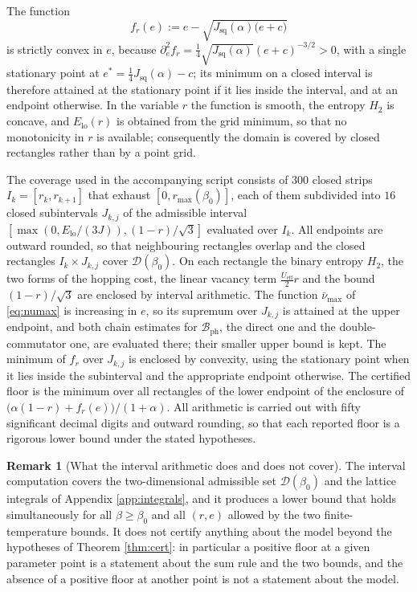 \documentclass[11pt]{article}
\numberwithin{equation}{section}
\newcommand{\ph}{\mathrm{ph}}
\newcommand{\eff}{\mathrm{eff}}
\theoremstyle{definition}
\newtheorem{remark}[theorem]{Remark}
\begin{document}
The function
\begin{equation}
f_{r}(e):=e-\sqrt{J_{\mathrm{sq}}(\alpha)\big(e+c\big)}
\label{eq:fr}
\end{equation}
is strictly convex in $e$, because $\partial_{e}^{2}f_{r}=\frac14\sqrt{J_{\mathrm{sq}}(\alpha)}(e+c)^{-3/2}>0$,
with a single stationary point at $e^{*}=\frac14J_{\mathrm{sq}}(\alpha)-c$; its minimum on
a closed interval is therefore attained at the stationary point if it lies inside the
interval, and at an endpoint otherwise. In the variable $r$ the function is smooth, the
entropy $H_{2}$ is concave, and $E_{\mathrm{lo}}(r)$ is obtained from the grid minimum,
so that no monotonicity in $r$ is available; consequently the domain is covered by
closed rectangles rather than by a point grid.

The coverage used in the accompanying script consists of $300$ closed strips
$I_{k}=[r_{k},r_{k+1}]$ that exhaust $[0,r_{\max}(\beta_0)]$, each of them subdivided into
$16$ closed subintervals $J_{k,j}$ of the admissible interval
$[\max(0,E_{\mathrm{lo}}/(3J)),(1-r)/\sqrt3]$ evaluated over $I_{k}$. All endpoints are
outward rounded, so that neighbouring rectangles overlap and the closed rectangles
$I_{k}\times J_{k,j}$ cover $\mathcal{D}(\beta_0)$. On each rectangle the binary entropy
$H_{2}$, the two forms of the hopping cost, the linear vacancy term
$\frac{U_{\eff}}{2}r$ and the bound $(1-r)/\sqrt3$ are enclosed by interval arithmetic.
The function $\bar\nu_{\max}$ of \eqref{eq:numax} is increasing in $e$, so its supremum
over $J_{k,j}$ is attained at the upper endpoint, and both chain estimates for
$\mathcal{B}_{\ph}$, the direct one and the double-commutator one, are evaluated there;
their smaller upper bound is kept. The minimum of $f_{r}$ over $J_{k,j}$ is enclosed by
convexity, using the stationary point when it lies inside the subinterval and the
appropriate endpoint otherwise. The certified floor is the minimum over all rectangles of
the lower endpoint of the enclosure of $\big(\alpha(1-r)+f_{r}(e)\big)/(1+\alpha)$. All
arithmetic is carried out with fifty significant decimal digits and outward rounding, so
that each reported floor is a rigorous lower bound under the stated hypotheses.

\begin{remark}[What the interval arithmetic does and does not cover]\label{rem:ia}
The interval computation covers the two-dimensional admissible set
$\mathcal{D}(\beta_0)$ and the lattice integrals of Appendix \ref{app:integrals}, and it
produces a lower bound that holds simultaneously for all $\beta\ge\beta_0$ and all
$(r,e)$ allowed by the two finite-temperature bounds. It does not certify anything about
the model beyond the hypotheses of Theorem \ref{thm:cert}: in particular a positive floor
at a given parameter point is a statement about the sum rule and the two bounds, and the
absence of a positive floor at another point is not a statement about the model.
\end{remark}
\end{document}
